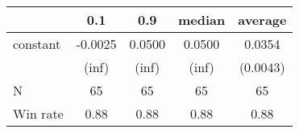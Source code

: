 \begin{tabular}{lcccc}
\hline
         &   0.1   &  0.9   & median & average   \\
\midrule
\midrule
constant & -0.0025 & 0.0500 & 0.0500 & 0.0354    \\
         & (inf)   & (inf)  & (inf)  & (0.0043)  \\
N        & 65      & 65     & 65     & 65        \\
Win rate & 0.88    & 0.88   & 0.88   & 0.88      \\
\hline
\end{tabular}